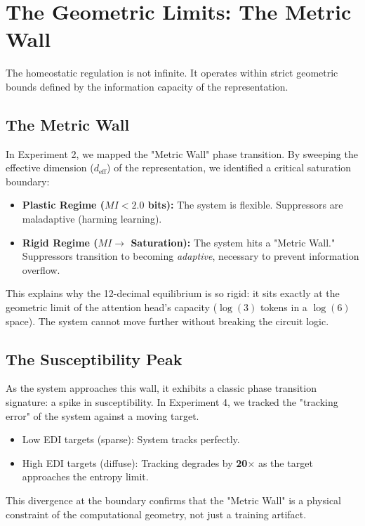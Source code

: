 \section{The Geometric Limits: The Metric Wall}\label{sec:geometry}

The homeostatic regulation is not infinite. It operates within strict geometric bounds defined by the information capacity of the representation.

\subsection{The Metric Wall}
In Experiment 2, we mapped the "Metric Wall" phase transition. By sweeping the effective dimension ($d_{\text{eff}}$) of the representation, we identified a critical saturation boundary:
\begin{itemize}
    \item \textbf{Plastic Regime ($MI < 2.0$ bits):} The system is flexible. Suppressors are maladaptive (harming learning).
    \item \textbf{Rigid Regime ($MI \to$ Saturation):} The system hits a "Metric Wall." Suppressors transition to becoming \emph{adaptive}, necessary to prevent information overflow.
\end{itemize}

This explains why the 12-decimal equilibrium is so rigid: it sits exactly at the geometric limit of the attention head's capacity ($\log(3)$ tokens in a $\log(6)$ space). The system cannot move further without breaking the circuit logic.

\subsection{The Susceptibility Peak}
As the system approaches this wall, it exhibits a classic phase transition signature: a spike in susceptibility. In Experiment 4, we tracked the "tracking error" of the system against a moving target.
\begin{itemize}
    \item Low EDI targets (sparse): System tracks perfectly.
    \item High EDI targets (diffuse): Tracking degrades by \textbf{20$\times$} as the target approaches the entropy limit.
\end{itemize}
This divergence at the boundary confirms that the "Metric Wall" is a physical constraint of the computational geometry, not just a training artifact.
